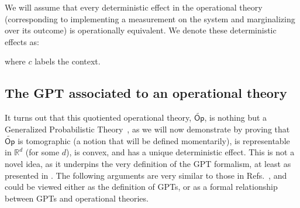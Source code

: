 \documentclass[10pt,twocolumn,aps,groupedaddress,nofootinbib]{revtex4}
\newcommand\Op{\mathsf{Op}}
\begin{document}
We will assume that every deterministic effect  in the operational theory (corresponding to implementing a measurement on the system and marginalizing over its outcome) is operationally equivalent. We denote these deterministic effects as:
\beq
{}
\eeq
where $c$ labels the context. 

\subsection{The GPT associated to an operational theory}

It turns out that this quotiented operational theory, $\widetilde{\Op}$, is nothing but a Generalized Probabilistic Theory~\cite{hardy2001quantum,barrett2007}, as we will now demonstrate by proving that $\widetilde{\Op}$ is tomographic (a notion that will be defined momentarily),
 is representable in $\mathds{R}^d$ (for some $d$), is convex, and has a unique deterministic effect. This is not a novel idea, as it underpins the very definition of the GPT formalism, at least as presented in \cite{hardy2011reformulating,chiribella2010probabilistic}. The following arguments are very similar to those in Refs.~\cite{chiribella2010probabilistic,chiribella2014dilation,chiribella2016quantum},
and could be viewed either as the definition of GPTs, or as a formal relationship between GPTs and operational theories.
\end{document}

